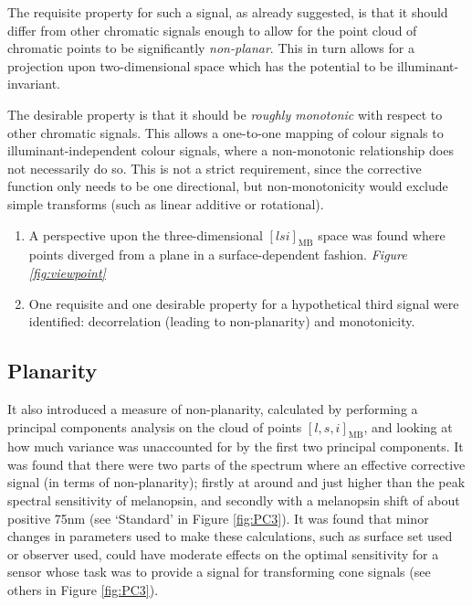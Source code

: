 The requisite property for such a signal, as already suggested, is that it should differ from other chromatic signals enough to allow for the point cloud of chromatic points to be significantly \emph{non-planar}. This in turn allows for a projection upon two-dimensional space which has the potential to be illuminant-invariant.

The desirable property is that it should be \emph{roughly monotonic} with respect to other chromatic signals. This allows a one-to-one mapping of colour signals to illuminant-independent colour signals, where a non-monotonic relationship does not necessarily do so. This is not a strict requirement, since the corrective function only needs to be one directional, but non-monotonicity would exclude simple transforms (such as linear additive or rotational).

\begin{enumerate}
    \item A perspective upon the three-dimensional $[lsi]_{\text{MB}}$ space was found where points diverged from a plane in a surface-dependent fashion. \emph{Figure \ref{fig:viewpoint}}
    \item One requisite and one desirable property for a hypothetical third signal were identified: decorrelation (leading to non-planarity) and monotonicity. 
\end{enumerate}



\subsection{Planarity}

It also introduced a measure of non-planarity, calculated by performing a principal components analysis on the cloud of points $[l,s,i]_{\text{MB}}$, and looking at how much variance was unaccounted for by the first two principal components. It was found that there were two parts of the spectrum where an effective corrective signal (in terms of non-planarity); firstly at around and just higher than the peak spectral sensitivity of melanopsin, and secondly with a melanopsin shift of about positive 75nm (see `Standard' in Figure \ref{fig:PC3}). It was found that minor changes in parameters used to make these calculations, such as surface set used or observer used, could have moderate effects on the optimal sensitivity for a sensor whose task was to provide a signal for transforming cone signals (see others in Figure \ref{fig:PC3}).

